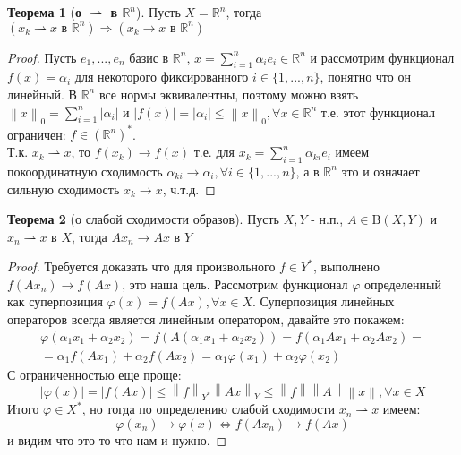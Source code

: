 \documentclass[12pt,a4paper]{article}
\theoremstyle{definition}
\newtheorem{theorem}{Теорема}
\newcommand{\Real}{\mathbb{R}}
\newcommand{\norm}[1]{\left\lVert#1\right\rVert}
\newcommand{\bounded}[2]{\textrm{B}(#1, #2)}
\newcommand{\conj}[1]{\left(#1\right)^*}
\newcommand{\weakto}{\rightharpoonup}
\begin{document}
\begin{theorem}[\textbf{о $\weakto$ в $\Real^n$}]
	Пусть $X = \Real^n$, тогда $(x_k \weakto x \text{ в } \Real^n) \Rightarrow (x_k \to x \text{ в } \Real^n)$
\end{theorem}
\begin{proof}
	Пусть $e_1, ..., e_n$ базис в $\Real^n$, $x = \sum\limits_{i=1}^{n}{\alpha_i e_i} \in \Real^n$ и рассмотрим функционал $f(x) = \alpha_i$ для некоторого фиксированного $i \in \{1,...,n\}$, понятно что он линейный. В $\Real^n$ все нормы эквивалентны, поэтому можно взять \\ $\norm{x}_0 =\sum\limits_{i=1}^{n}{|\alpha_i|}$ и $|f(x)| = |\alpha_i| \leq \norm{x}_0, \forall x \in \Real^n$ т.е. этот функционал ограничен: $f \in \conj{\Real^n}$.
	\\ 
	
	Т.к. $x_k \weakto x$, то $f(x_k) \to f(x)$ т.е. для $x_k = \sum\limits_{i=1}^{n}{\alpha_{ki} e_i}$ имеем покоординатную сходимость $\alpha_{ki} \to \alpha_i, \forall i \in \{1, ..., n\}$, а в $\Real^n$ это и означает сильную сходимость $x_k \to x$, ч.т.д.
\end{proof}

\begin{theorem}[о слабой сходимости образов]
	Пусть $X, Y$ - н.п., $A \in \bounded{X}{Y}$ и $x_n \weakto x$ в $X$, тогда $Ax_n \to Ax$ в $Y$
\end{theorem}
\begin{proof}
	Требуется доказать что для произвольного $f \in Y^*$, выполнено $f(Ax_n) \to f(Ax)$, это наша цель. Рассмотрим функционал $\varphi$ определенный как суперпозиция $\varphi(x) = f(Ax), \forall x \in X$. Суперпозиция линейных операторов всегда является линейным оператором, давайте это покажем:
	\begin{multline*}
		\varphi(\alpha_1 x_1 + \alpha_2 x_2) = f(A(\alpha_1 x_1 + \alpha_2 x_2)) = f(\alpha_1 Ax_1 + \alpha_2 Ax_2) = \\ = \alpha_1 f(Ax_1) + \alpha_2 f(Ax_2) = \alpha_1 \varphi(x_1) + \alpha_2 \varphi(x_2)
	\end{multline*}
	С ограниченностью еще проще:
	$$|\varphi(x)| = |f(Ax)| \leq \norm{f}_{Y^*} \norm{Ax}_Y \leq \norm{f} \norm{A} \norm{x}, \forall x \in X$$
	Итого $\varphi \in X^*$, но тогда по определению слабой сходимости $x_n \weakto x$ имеем:
	$$\varphi(x_n) \to \varphi(x) \Leftrightarrow f(Ax_n) \to f(Ax)$$
	и видим что это то что нам и нужно.
\end{proof}
\end{document}
